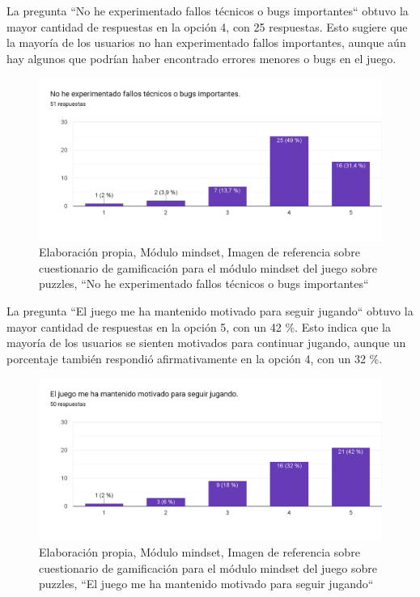 La pregunta ``No he experimentado fallos técnicos o bugs importantes`` obtuvo la mayor cantidad de respuestas en la opción 4, con 25 respuestas. Esto sugiere que la mayoría de los usuarios no han experimentado fallos importantes, aunque aún hay algunos que podrían haber encontrado errores menores o bugs en el juego.

\begin{figure}[H]
  \centering
  \includegraphics[width=0.7\linewidth]{Imagenes/mc7.png}
  \caption{Elaboración propia, Módulo mindset, Imagen de referencia sobre cuestionario de gamificación para el módulo mindset del juego sobre puzzles, ``No he experimentado fallos técnicos o bugs importantes``}
  \label{fig:cuestionario7mindset}
\end{figure}



La pregunta ``El juego me ha mantenido motivado para seguir jugando`` obtuvo la mayor cantidad de respuestas en la opción 5, con un 42 \%. Esto indica que la mayoría de los usuarios se sienten motivados para continuar jugando, aunque un porcentaje también respondió afirmativamente en la opción 4, con un 32 \%.

\begin{figure}[H]
  \centering
  \includegraphics[width=0.7\linewidth]{Imagenes/mc8.png}
  \caption{Elaboración propia, Módulo mindset, Imagen de referencia sobre cuestionario de gamificación para el módulo mindset del juego sobre puzzles, ``El juego me ha mantenido motivado para seguir jugando``}
  \label{fig:cuestionario8mindset}
\end{figure}



